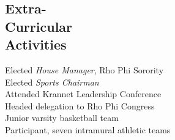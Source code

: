 \documentclass[margin]{résumé}
\begin{document}
\begin{resume}
\section{\sc Extra- \\ Curricular \\ Activities}             
            Elected {\it House Manager}, Rho Phi Sorority \\
            Elected {\it Sports Chairman} \\
            Attended Krannet Leadership Conference \\
                Headed delegation to Rho Phi Congress \\
                Junior varsity basketball team \\
                Participant, seven intramural athletic teams 
 

\end{resume}
\end{document}

